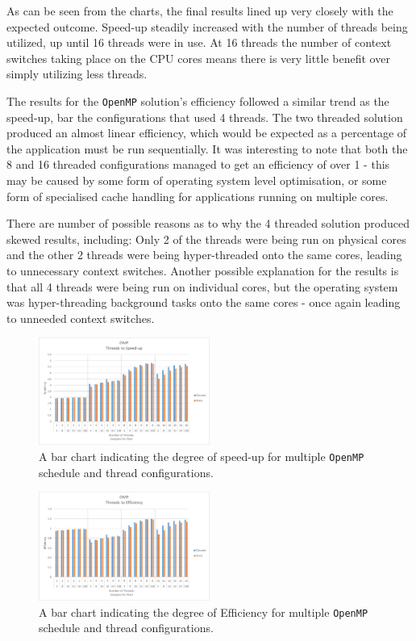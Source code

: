 \documentclass[journal,transmag]{IEEEtran}
\begin{document}
			As can be seen from the charts, the final results lined up very closely with the expected outcome. Speed-up steadily increased with the number of threads being utilized, up until 16 threads were in use. At 16 threads the number of context switches taking place on the CPU cores means there is very little benefit over simply utilizing less threads.
			
			The results for the \texttt{OpenMP} solution's efficiency followed a similar trend as the speed-up, bar the configurations that used 4 threads. The two threaded solution produced an almost linear efficiency, which would be expected as a percentage of the application must be run sequentially. It was interesting to note that both the 8 and 16 threaded configurations managed to get an efficiency of over 1 - this may be caused by some form of operating system level optimisation, or some form of specialised cache handling for applications running on multiple cores.  
			
			There are number of possible reasons as to why the 4 threaded solution produced skewed results, including: Only 2 of the threads were being run on physical cores and the other 2 threads were being hyper-threaded onto the same cores, leading to unnecessary context switches. Another possible explanation for the results is that all 4 threads were being run on individual cores, but the operating system was hyper-threading background tasks onto the same cores - once again leading to unneeded context switches. 
			
		\begin{figure}[h]
			\centering
			\includegraphics[width = 0.5\textwidth]{chartOMPSpeed}
			\caption{A bar chart indicating the degree of speed-up for multiple \texttt{OpenMP} schedule and thread configurations.}
			\label{fig_omp_speed}
		\end{figure}
		
		\begin{figure}[h]
			\centering
			\includegraphics[width = 0.5\textwidth]{chartOMPEff}
			\caption{A bar chart indicating the degree of Efficiency for multiple \texttt{OpenMP} schedule and thread configurations.}
			\label{fig_omp_eff}
		\end{figure}
		
\end{document}
